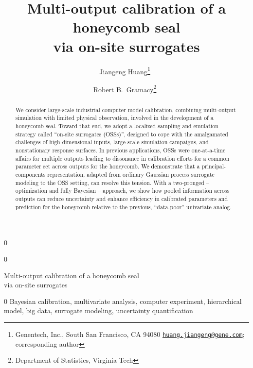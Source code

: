 \documentclass[12pt]{article}
\newcommand{\blu}[1]{\textcolor{black}{#1}} %
\newcommand{\blunew}[1]{\textcolor{black}{#1}} %
\newcommand{\blind}{0}
\def\spacingset#1{\renewcommand{\baselinestretch}%
{#1}\small\normalsize} \spacingset{1}
\begin{document}
\blind
{
\title{\vspace{-1cm} Multi-output calibration of a honeycomb seal\\via on-site surrogates}
\author{
 Jiangeng Huang\thanks{Genentech, Inc., South San Francisco, CA 94080 \href{mailto:huangj@vt.edu}{\tt huang.jiangeng@gene.com}; corresponding author}\
\and 
Robert B.~Gramacy\thanks{Department of Statistics, Virginia Tech}\
}
\date{}
\maketitle
}\fi

\blind
{
  \bigskip
  \bigskip
  \bigskip
  \begin{center}
    {\LARGE Multi-output calibration of a honeycomb seal\\via on-site surrogates}
\end{center}
  \medskip
  \bigskip
} \fi

\begin{abstract}

We consider large-scale industrial computer model calibration, combining
multi-output simulation with limited physical observation, involved in the
development of a honeycomb seal. Toward that end, we adopt a localized
sampling and emulation strategy called ``on-site surrogates (OSSs)'', designed
to cope with the amalgamated challenges of high-dimensional inputs,
large-scale simulation campaigns, and nonstationary response surfaces.  In
previous applications, OSSs were one-at-a-time affairs for multiple outputs
leading to dissonance in calibration efforts for a common parameter set across
outputs for the honeycomb.  \blunew{We demonstrate that} a
principal-components representation, adapted from ordinary Gaussian process
surrogate modeling to the OSS setting, can resolve this tension.   With a
two-pronged -- optimization and fully Bayesian -- approach, we show how
pooled information across outputs can reduce uncertainty and enhance
efficiency in calibrated parameters \blu{and
prediction} for the honeycomb relative to the previous, ``data-poor''
univariate analog.

\end{abstract}

\blind
{
\bigskip
{}
Bayesian calibration,  multivariate analysis, computer experiment,
hierarchical model, big data, surrogate modeling, uncertainty
quantification}\fi

 \doublespacing
\end{document}
